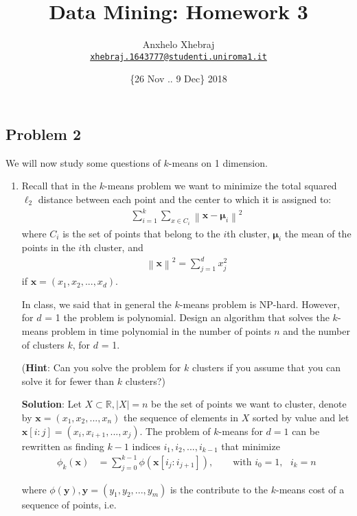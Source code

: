 \documentclass[a4paper]{article}
\title{Data Mining: Homework 3}
\author{Anxhelo Xhebraj \\
        \href{mailto:xhebraj.1643777@studenti.uniroma1.it}{\texttt{xhebraj.1643777@studenti.uniroma1.it}}
        }
\date{ \{26 Nov .. 9 Dec\} 2018}
\newcommand{\norm}[1]{\left\lVert#1\right\rVert}
\begin{document}
\maketitle

\subsection*{Problem 2}

We will now study some questions of $k$-means on 1 dimension.

\begin{enumerate}
  \item Recall that in the $k$-means problem we want to minimize the total
    squared $\ell_2$ distance between each point and the center to which it is
    assigned to:
    \begin{align*}
      \sum_{i = 1}^{k} \sum_{x \in C_i} \norm{\mathbf{x} - \boldsymbol{\mu}_i}^2
    \end{align*}
    where $C_i$ is the set of points that belong to the $i$th cluster,
    $\boldsymbol{\mu}_i$ the mean of the points in the $i$th cluster, and
    \begin{align*}
      \norm{\mathbf{x}}^2 = \sum_{j = 1}^d x_j^2
    \end{align*}
    if $\mathbf{x} = (x_1, x_2, ..., x_d)$.

    In class, we said that in general the $k$-means problem is NP-hard. However,
    for $d$ = 1 the problem is polynomial. Design an algorithm that solves the
    $k$-means problem in time polynomial in the number of points $n$ and the
    number of clusters $k$, for $d$ = 1.

    (\textbf{Hint}: Can you solve the problem for $k$ clusters if you assume
    that you can solve it for fewer than $k$ clusters?)

    \textbf{Solution}: Let $X \subset \mathbb{R}, |X| = n$ be the set of points we want
    to cluster, denote by $\mathbf{x} = (x_1, x_2, ..., x_n)$ the sequence of
    elements in $X$ sorted by value and let $\mathbf{x}[i:j] = (x_i, x_{i + 1}, ..., x_{j}) $.
    The problem of $k$-means for $d = 1$ can be rewritten as finding $k-1$ indices
    $i_1, i_2, ..., i_{k-1}$ that minimize
    \begin{align*}
      \phi_k(\mathbf{x}) &= \sum_{j = 0}^{k - 1} \phi(\mathbf{x}[i_j:i_{j +
      1}]), \qquad \text{with } i_0 = 1, \text{ } i_k = n
    \end{align*}

    where $\phi(\mathbf{y}), \mathbf{y} = (y_1, y_2, ..., y_m)$ is the
    contribute to the $k$-means cost of a sequence of points, i.e.
    

\end{enumerate}
\end{document}
